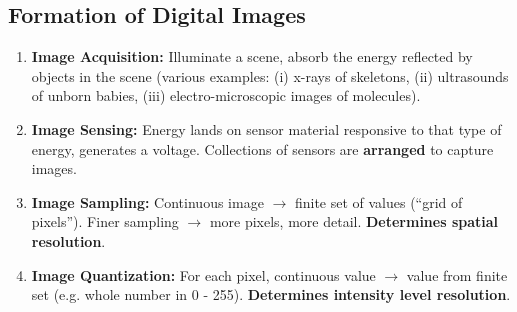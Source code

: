 \begin{figure}[H]
  \centering
\end{figure}

\subsection*{Formation of Digital Images}

\begin{enumerate}
  \item \textbf{Image Acquisition:} Illuminate a scene, absorb the energy reflected by objects in the scene (various examples: (i) x-rays of skeletons, (ii) ultrasounds of unborn babies, (iii) electro-microscopic images of molecules).
  \item \textbf{Image Sensing:} Energy lands on sensor material responsive to that type of energy, generates a voltage. Collections of sensors are \textbf{arranged} to capture images.
  \item \textbf{Image Sampling:} Continuous image $\rightarrow$ finite set of values (\enquote{grid of pixels}). Finer sampling $\rightarrow$ more pixels, more detail. \textbf{Determines spatial resolution}.
  \item \textbf{Image Quantization:} For each pixel, continuous value $\rightarrow$ value from finite set (e.g. whole number in 0 - 255). \textbf{Determines intensity level resolution}.
\end{enumerate}

